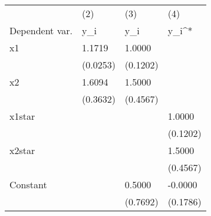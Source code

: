 \begin{tabular}{p{}p{}p{}p{}}
\hline \hline
& (2) & (3) & (4) \\
Dependent var. & y_i & y_i & y_i^* \\ \hline
x1                  &      1.1719&      1.0000&            \\
                    &    (0.0253)&    (0.1202)&            \\
x2                  &      1.6094&      1.5000&            \\
                    &    (0.3632)&    (0.4567)&            \\
x1star              &            &            &      1.0000\\
                    &            &            &    (0.1202)\\
x2star              &            &            &      1.5000\\
                    &            &            &    (0.4567)\\
Constant            &            &      0.5000&     -0.0000\\
                    &            &    (0.7692)&    (0.1786)\\
\hline\hline
\end{tabular}
